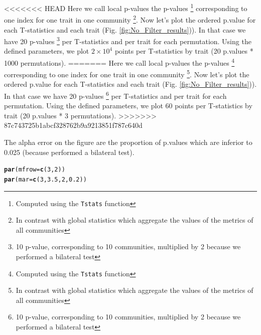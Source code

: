 \documentclass[12pt]{article}\usepackage[]{graphicx}\usepackage[]{color}
\makeatletter
\newcommand{\hlnum}[1]{\textcolor[rgb]{0.686,0.059,0.569}{#1}}%
\newcommand{\hlstd}[1]{\textcolor[rgb]{0.345,0.345,0.345}{#1}}%
\newcommand{\hlkwc}[1]{\textcolor[rgb]{0.333,0.667,0.333}{#1}}%
\newcommand{\hlkwd}[1]{\textcolor[rgb]{0.737,0.353,0.396}{\textbf{#1}}}%
\newenvironment{kframe}{%
 \def\at@end@of@kframe{}%
 \ifinner\ifhmode%
  \def\at@end@of@kframe{\end{minipage}}%
  \begin{minipage}{\columnwidth}%
 \fi\fi%
 \def\FrameCommand##1{\hskip\@totalleftmargin \hskip-\fboxsep
 \colorbox{shadecolor}{##1}\hskip-\fboxsep
     \hskip-\linewidth \hskip-\@totalleftmargin \hskip\columnwidth}%
 \MakeFramed {\advance\hsize-\width
   \@totalleftmargin\z@ \linewidth\hsize
   \@setminipage}}%
 {\par\unskip\endMakeFramed%
 \at@end@of@kframe}
\newenvironment{knitrout}{}{} %
\makeatother
\begin{document}
\begin{landscape}
<<<<<<< HEAD
Here we call local p-values the p-values \footnote{Computed using the \texttt{Tstats} function} corresponding to one index for one trait in one community \footnote{In contrast with global statistics which aggregate the values of the metrics of all communities}. Now let's plot the ordered p.value for each T-statistics and each trait (Fig. \ref{fig:No_Filter_results})). In that case we have 20 p-values \footnote{10 p-value, corresponding to 10 communities, multiplied by 2 because we performed a bilateral test} per T-statistics and per trait for each permutation. Using the defined parameters, we plot \ensuremath{2\times 10^{4}} points per T-statistics by trait (20 p.values * 1000 permutations). 
=======
Here we call local p-values the p-values \footnote{Computed using the \texttt{Tstats} function} corresponding to one index for one trait in one community \footnote{In contrast with global statistics which aggregate the values of the metrics of all communities}. Now let's plot the ordered p.value for each T-statistics and each trait (Fig. \ref{fig:No_Filter_results})). In that case we have 20 p-values \footnote{10 p-value, corresponding to 10 communities, multiplied by 2 because we performed a bilateral test} per T-statistics and per trait for each permutation. Using the defined parameters, we plot 60 points per T-statistics by trait (20 p.values * 3 permutations). 
>>>>>>> 87c743725b1abcf328762b9a9213851f787c640d

The alpha error on the figure are the proportion of p.values which are inferior to 0.025 (because performed a bilateral test).

\begin{knitrout}\small
{}\color{fgcolor}\begin{kframe}
\begin{alltt}
\hlkwd{par}\hlstd{(}\hlkwc{mfrow} \hlstd{=} \hlkwd{c}\hlstd{(}\hlnum{3}\hlstd{,} \hlnum{2}\hlstd{))}
\hlkwd{par}\hlstd{(}\hlkwc{mar} \hlstd{=} \hlkwd{c}\hlstd{(}\hlnum{3}\hlstd{,} \hlnum{3.5}\hlstd{,} \hlnum{2}\hlstd{,} \hlnum{0.2}\hlstd{))}


\end{alltt}
\end{kframe}
\end{knitrout}
\end{landscape}
\end{document}
